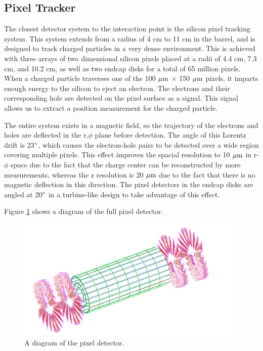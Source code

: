 \subsection{Pixel Tracker}
The closest detector system to the interaction point is the silicon pixel tracking system.  
This system extends from a radius of 4 cm to 11 cm in the barrel, and is designed to track charged particles in a very dense environment.  
This is achieved with three arrays of two dimensional silicon pixels placed at a radii of 4.4 cm, 7.3 cm, and 10.2 cm, as well as two endcap disks for a total of 65 million pixels.  
When a charged particle traverses one of the 100 $\mathrm{\mu m}$ $\times$ 150 $\mathrm{\mu m}$ pixels, it imparts enough energy to the silicon to eject an electron.  
The electrons and their corresponding hole are detected on the pixel surface as a signal.  
This signal allows us to extract a position measurement for the charged particle.  

The entire system exists in a magnetic field, so the trajectory of the electrons and holes are deflected in the r,$\phi$ plane before detection.  
The angle of this Lorentz drift is 23$\mathrm{^{\circ}}$, which causes the electron-hole pairs to be detected over a wide region covering multiple pixels.  
This effect improves the spacial resolution to 10 $\mathrm{\mu m}$ in r-$\phi$ space due to the fact that the charge center can be reconstructed by more measurements, 
whereas the z resolution is 20 $\mathrm{\mu m}$ due to the fact that there is no magnetic deflection in this direction. 
The pixel detectors in the endcap disks are angled at 20$\mathrm{^{\circ}}$ in a turbine-like design to take advantage of this effect.  

Figure \ref{figs:CMSpixel} shows a diagram of the full pixel detector.    

\begin{figure}
\begin{center}
\includegraphics[width=1.0\linewidth]{figs/CMSpixel.png}
\caption{A diagram of the pixel detector.}
\label{figs:CMSpixel}
\end{center}
\end{figure}
  
